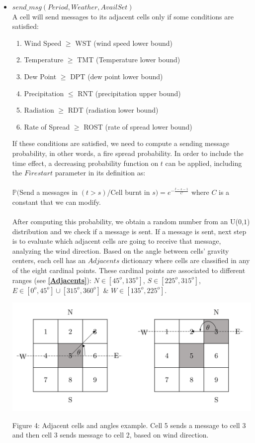 \documentclass[11pt]{article}
\begin{document}
\begin{enumerate}
\begin{enumerate}
\begin{itemize}
			
 			\item $send\_msg(Period,Weather,AvailSet)$ \\
 			A cell will send messages to its adjacent cells only if some conditions are satisfied: 
 			\begin{enumerate}
 				\item Wind Speed $\geq$ WST \hfill (wind speed lower bound)
 				\item Temperature $\geq$ TMT \hfill (Temperature lower bound)
 				\item Dew Point $\geq$ DPT \hfill (dew point lower bound) 
				\item Precipitation $\leq$ RNT \hfill (precipitation upper bound) 				
 				\item Radiation $\geq$ RDT \hfill (radiation lower bound) 						\item Rate of Spread $\geq$ ROST \hfill (rate of spread lower bound)\\
 				\end{enumerate}
 				If these conditions are satisfied, we need to compute a sending message probability, in other words, a fire spread probability. In order to include the time effect, a decreasing probability function on $t$ can be applied, including the $Firestart$ parameter in its definition as: \\ \\ $\mathbb{P}($Send a messages in $(t>s)$/Cell burnt in $s)= e^{-\frac{t-s-1}{C}} $ where $C$ is a constant that we can modify. \\ \\
 				After computing this probability, we obtain a random number from an U($0$,$1$) distribution and we check if a message is sent. If a message is sent, next step is to evaluate which adjacent cells are going to receive that message, analyzing the wind direction. Based on the angle between cells' gravity centers, each cell has an $Adjacents$ dictionary where cells are classified in any of the eight cardinal points. These cardinal points are associated to different ranges (see \textbf{\ref{Adjacents}}): $N \in [45^o,135^o]$, $ S \in [225^o,315^o]$, $ E \in [0^o,45^o] \cup [315^o,360^o] $ \& $ W \in [135^o,225^o]$.

\includegraphics[scale=0.95]{Adjacents.png}
\begin{center}
Figure 4: Adjacent cells and angles example. Cell 5 sends a message to cell 3 and then cell 3 sends message to cell 2, based on wind direction. \\  
\end{center}  



\end{itemize}
\end{enumerate}
\end{enumerate}
\end{document}
